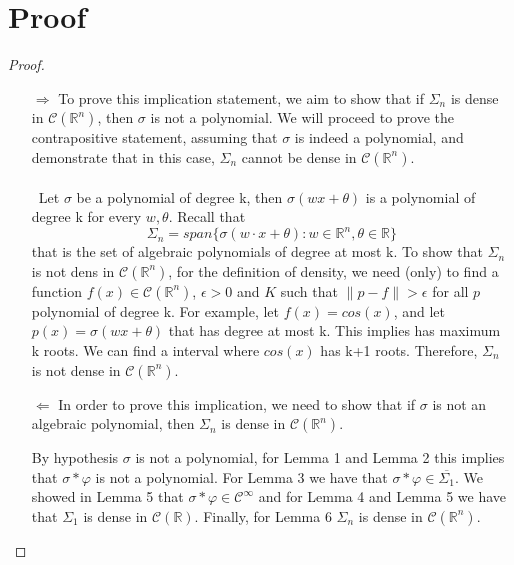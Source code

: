 \documentclass[../main.tex]{subfiles}
\begin{document}
\section{Proof}
	\begin{proof}~ %

	\begin{enumerate}
		\item[$\Rightarrow$] 
		To prove this implication statement, we aim to show that if $\Sigma_n$ is dense in $\mathcal{C}(\mathbb{R}^n)$, then $\sigma$ is not a polynomial.
		 We will proceed to prove the contrapositive statement, assuming that $\sigma$ is indeed a polynomial, and demonstrate that in this case, $\Sigma_n$ cannot be dense in $\mathcal{C}(\mathbb{R}^n)$. \\ \\ Let $\sigma$ be a polynomial of degree k, then $\sigma(wx+\theta)$ is a polynomial  of degree k for every $w,\theta$. Recall that $$ \Sigma_n = span\{\sigma(w\cdot x + \theta) : w\in \mathbb{R}^n, \theta \in \mathbb{R} \}$$  that is the set of algebraic polynomials of degree at most k. To show that $\Sigma_n$ is not dens in $\mathcal{C}(\mathbb{R}^n)$, for the definition of density, we need (only) to find a function $f(x)\in \mathcal{C}(\mathbb{R}^n)$, $\epsilon > 0$ and $K$ such that  $\| p-f \| > \epsilon$ for all $p$ polynomial of degree k. For example, let $f(x)=cos(x)$, and let $p(x)= \sigma(wx+\theta)$ that has degree at most k. This implies has maximum k roots. We can find a interval where $cos(x)$ has k+1 roots. Therefore, $\Sigma_n$ is not dense in $\mathcal{C}(\mathbb{R}^n)$. 

		\item[$\Leftarrow$]  In order to prove this implication, we need to show that if $\sigma$ is not an algebraic polynomial, then $\Sigma_n$ is dense in $\mathcal{C}(\mathbb{R}^n)$.
		
		
		 By hypothesis $\sigma$ is not a polynomial, for Lemma 1 and Lemma 2 this implies that $\sigma \ast \varphi$ is not a polynomial. For Lemma 3 we have that $\sigma \ast \varphi \in \overline{\Sigma_1}$. We showed in Lemma 5 that $\sigma \ast \varphi \in \mathcal{C}^\infty$ and for Lemma 4 and  Lemma 5 we have that $\Sigma_1$ is dense in $\mathcal{C}(\mathbb{R})$. Finally, for Lemma 6 $\Sigma_n$ is dense in $\mathcal{C}(\mathbb{R}^n)$.
	\end{enumerate}
\end{proof}

	\cite{leshno1993multilayer}
\end{document}
